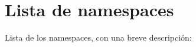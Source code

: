 \section{Lista de \textquotesingle{}namespaces\textquotesingle{}}
Lista de los \textquotesingle{}namespaces\textquotesingle{}, con una breve descripción\+:\begin{DoxyCompactList}
\item{}
\item{}
\end{DoxyCompactList}
